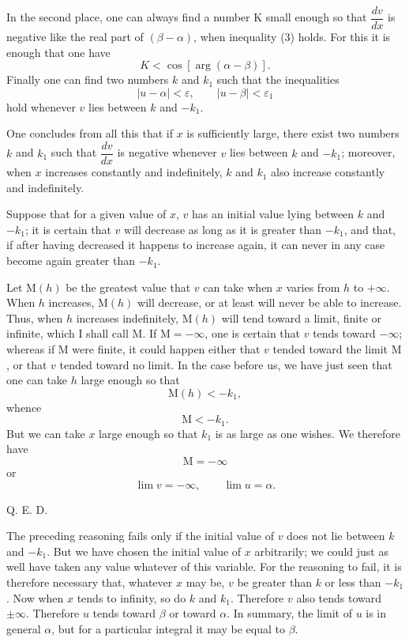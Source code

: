\documentclass[11pt]{article}
\begin{document}
In the second place, one can always find a number K small enough so that $\dfrac{dv}{dx}$ is negative like the real part of $(\beta-\alpha)$, when inequality (3) holds. For this it is enough that one have
\[
K<\cos[\arg(\alpha-\beta)].
\]
Finally one can find two numbers $k$ and $k_1$ such that the inequalities
\[
|u-\alpha|<\varepsilon,
\qquad
|u-\beta|<\varepsilon_1
\]
hold whenever $v$ lies between $k$ and $-k_1$.

One concludes from all this that if $x$ is sufficiently large, there exist two numbers $k$ and $k_1$ such that $\dfrac{dv}{dx}$ is negative whenever $v$ lies between $k$ and $-k_1$; moreover, when $x$ increases constantly and indefinitely, $k$ and $k_1$ also increase constantly and indefinitely.

Suppose that for a given value of $x$, $v$ has an initial value lying between $k$ and $-k_1$; it is certain that $v$ will decrease as long as it is greater than $-k_1$, and that, if after having decreased it happens to increase again, it can never in any case become again greater than $-k_1$.

Let $\mathrm{M}(h)$ be the greatest value that $v$ can take when $x$ varies from $h$ to $+\infty$. When $h$ increases, $\mathrm{M}(h)$ will decrease, or at least will never be able to increase. Thus, when $h$ increases indefinitely, $\mathrm{M}(h)$ will tend toward a limit, finite or infinite, which I shall call $\mathrm{M}$. If $\mathrm{M}=-\infty$, one is certain that $v$ tends toward $-\infty$; whereas if $\mathrm{M}$ were finite, it could happen either that $v$ tended toward the limit $\mathrm{M}$, or that $v$ tended toward no limit. In the case before us, we have just seen that one can take $h$ large enough so that
\[
\mathrm{M}(h)<-k_1,
\]
whence
\[
\mathrm{M}<-k_1.
\]
But we can take $x$ large enough so that $k_1$ is as large as one wishes. We therefore have
\[
\mathrm{M}=-\infty
\]
or
\[
\lim v=-\infty,
\qquad
\lim u=\alpha.
\]
\begin{flushright}Q. E. D.\end{flushright}

The preceding reasoning fails only if the initial value of $v$ does not lie between $k$ and $-k_1$. But we have chosen the initial value of $x$ arbitrarily; we could just as well have taken any value whatever of this variable. For the reasoning to fail, it is therefore necessary that, whatever $x$ may be, $v$ be greater than $k$ or less than $-k_1$. Now when $x$ tends to infinity, so do $k$ and $k_1$. Therefore $v$ also tends toward $\pm\infty$. Therefore $u$ tends toward $\beta$ or toward $\alpha$. In summary, the limit of $u$ is in general $\alpha$, but for a particular integral it may be equal to $\beta$.
\end{document}
